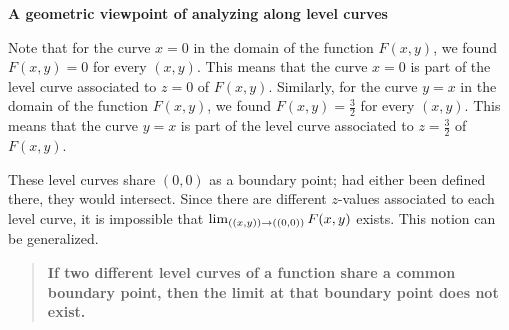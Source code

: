 \documentclass{ximera}
\begin{document}
 \textbf{A geometric viewpoint of analyzing along level curves}

\begin{explanation}
Note that for the curve $x=0$ in the domain of the function $F(x,y)$, we found $F(x,y) = 0$ for every $(x,y)$.  This means that the curve $x=0$ is part of the level curve associated to $z=0$ of $F(x,y)$.  Similarly, for the curve $y=x$ in the domain of the function $F(x,y)$, we found $F(x,y) = \frac{3}{2}$ for every $(x,y)$.  This means that the curve $y=x$ is part of the level curve associated to $z= \frac{3}{2}$ of $F(x,y)$.

These level curves share $(0,0)$ as a boundary point; had either been defined there, they would intersect.  Since there are different $z$-values associated to each level curve, it is impossible that $\lim_{\left((x,y)\right) \to \left((0,0)\right)} F(x,y)$ exists.  This notion can be generalized.
\end{explanation}

\begin{quote}
\textbf{If two different level curves of a function share a common boundary point, then the limit at that boundary point does not exist.}
\end{quote}
\end{document}
